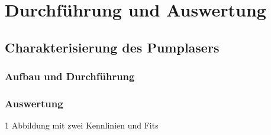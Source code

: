 \section{Durchführung und Auswertung}

\subsection{Charakterisierung des Pumplasers}

\subsubsection{Aufbau und Durchführung}

\subsubsection{Auswertung}

1 Abbildung mit zwei Kennlinien und Fits